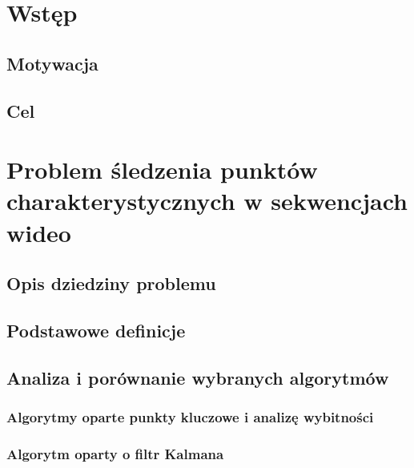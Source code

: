 \chapter{Wstęp}\label{Chapter_Wstep}

\section{Motywacja}\label{Section_Motywacja}

\section{Cel}\label{Section_Cel}

\chapter{Problem śledzenia punktów charakterystycznych w sekwencjach wideo}

\section{Opis dziedziny problemu}\label{Section_Problematyka}
\cite{SalientPointsTracking05}
\cite{GoodFeaturesToTrack94}
\cite{LucasKanadeTracker81}

\section{Podstawowe definicje}\label{Section_Definicje}
\cite{SalientPointsTracking05}
\cite{GoodFeaturesToTrack94}
\cite{LucasKanadeTracker81}

\section{Analiza i porównanie wybranych algorytmów}\label{Section_Algorytmy}

\subsection{Algorytmy oparte punkty kluczowe i analizę wybitności}\label{Subsection_SaliencyAndKeypoints}
\cite{SalientPointsTracking05}

\subsection{Algorytm oparty o filtr Kalmana}\label{Subsection_Kalman}
\cite{KalmanFilter95}

